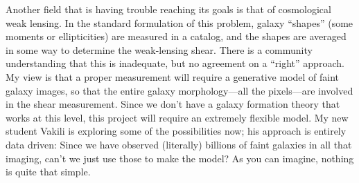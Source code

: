 \documentclass[11pt, letterpaper]{article}
\begin{document}
Another field that is having trouble reaching its goals is that of cosmological weak lensing.
In the standard formulation of this problem,
  galaxy ``shapes'' (some moments or ellipticities) are measured in a catalog,
  and the shapes are averaged in some way to determine the weak-lensing shear.
There is a community understanding that this is inadequate, but no agreement on a ``right'' approach.
My view is that a proper measurement will require a generative model of faint galaxy images,
  so that the entire galaxy morphology---all the pixels---are involved in the shear measurement.
Since we don't have a galaxy formation theory that works at this level,
  this project will require an extremely flexible model.
My new student Vakili is exploring some of the possibilities now;
  his approach is entirely data driven:
Since we have observed (literally) billions of faint galaxies in all that imaging,
  can't we just use those to make the model?
As you can imagine, nothing is quite that simple.
\end{document}
